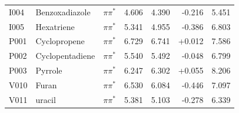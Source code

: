 {\begin{longtable}{lllrrrr}
I004 & Benzoxadiazole & $\pi\pi^*$ & 4.606 & 4.390 & -0.216 & 5.451 \\
I005 & Hexatriene & $\pi\pi^*$ & 5.341 & 4.955 & -0.386 & 6.803 \\
P001 & Cyclopropene & $\pi\pi^*$ & 6.729 & 6.741 & +0.012 & 7.586 \\
P002 & Cyclopentadiene & $\pi\pi^*$ & 5.540 & 5.492 & -0.048 & 6.799 \\
P003 & Pyrrole & $\pi\pi^*$ & 6.247 & 6.302 & +0.055 & 8.206 \\
V010 & Furan & $\pi\pi^*$ & 6.530 & 6.084 & -0.446 & 7.097 \\
V011 & uracil & $\pi\pi^*$ & 5.381 & 5.103 & -0.278 & 6.339 \\
\bottomrule\end{longtable}}
